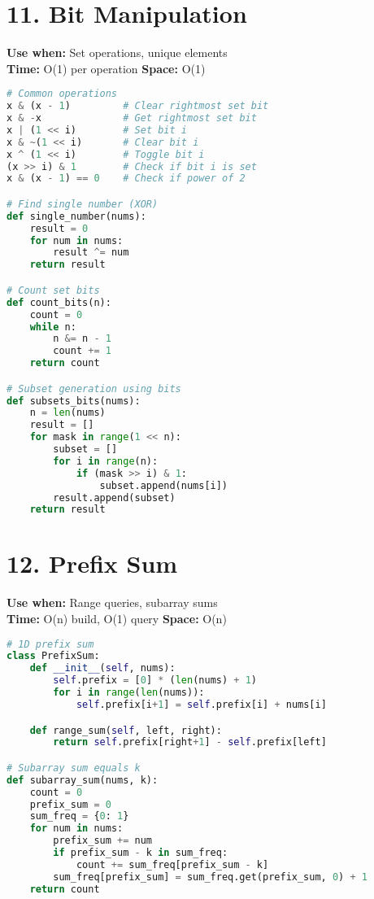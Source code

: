 \documentclass[8pt,landscape]{article}
\begin{document}
\begin{multicols}{3}
\section*{11. Bit Manipulation}
\textbf{Use when:} Set operations, unique elements \\
\textbf{Time:} O(1) per operation \quad \textbf{Space:} O(1)
\begin{lstlisting}[language=Python]
# Common operations
x & (x - 1)         # Clear rightmost set bit
x & -x              # Get rightmost set bit
x | (1 << i)        # Set bit i
x & ~(1 << i)       # Clear bit i
x ^ (1 << i)        # Toggle bit i
(x >> i) & 1        # Check if bit i is set
x & (x - 1) == 0    # Check if power of 2

# Find single number (XOR)
def single_number(nums):
    result = 0
    for num in nums:
        result ^= num
    return result

# Count set bits
def count_bits(n):
    count = 0
    while n:
        n &= n - 1
        count += 1
    return count

# Subset generation using bits
def subsets_bits(nums):
    n = len(nums)
    result = []
    for mask in range(1 << n):
        subset = []
        for i in range(n):
            if (mask >> i) & 1:
                subset.append(nums[i])
        result.append(subset)
    return result
\end{lstlisting}

\section*{12. Prefix Sum}
\textbf{Use when:} Range queries, subarray sums \\
\textbf{Time:} O(n) build, O(1) query \quad \textbf{Space:} O(n)
\begin{lstlisting}[language=Python]
# 1D prefix sum
class PrefixSum:
    def __init__(self, nums):
        self.prefix = [0] * (len(nums) + 1)
        for i in range(len(nums)):
            self.prefix[i+1] = self.prefix[i] + nums[i]

    def range_sum(self, left, right):
        return self.prefix[right+1] - self.prefix[left]

# Subarray sum equals k
def subarray_sum(nums, k):
    count = 0
    prefix_sum = 0
    sum_freq = {0: 1}
    for num in nums:
        prefix_sum += num
        if prefix_sum - k in sum_freq:
            count += sum_freq[prefix_sum - k]
        sum_freq[prefix_sum] = sum_freq.get(prefix_sum, 0) + 1
    return count


\end{lstlisting}
\end{multicols}
\end{document}
